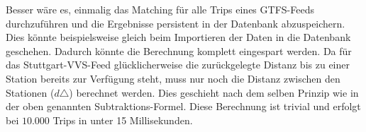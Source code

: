     \pagebreak

    Besser wäre es, einmalig das Matching für alle Trips eines GTFS-Feeds durchzuführen und die Ergebnisse persistent in der Datenbank abzuspeichern. Dies könnte beispielsweise gleich beim Importieren der Daten in die Datenbank geschehen. Dadurch könnte die Berechnung komplett eingespart werden. 
    Da für das Stuttgart-VVS-Feed glücklicherweise die zurückgelegte Distanz bis zu einer Station bereits zur Verfügung steht, muss nur noch die Distanz zwischen den Stationen ($d\triangle$) berechnet werden. Dies geschieht nach dem selben Prinzip wie in der oben genannten Subtraktions-Formel. Diese Berechnung ist trivial und erfolgt bei $10.000$ Trips in unter 15 Millisekunden.

